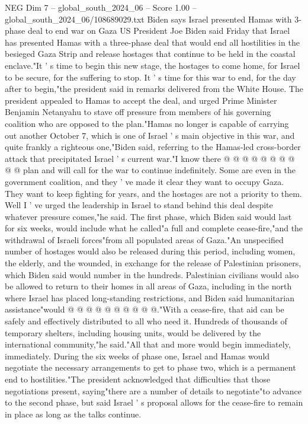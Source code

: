 \begin{textsample}{NEG Dim 7 – global\_south\_2024\_06 – Score 1.00 – global\_south\_2024\_06/108689029.txt}  \label{ex:f7_neg_219}
Biden says Israel presented Hamas with 3-phase deal to end war on Gaza US President Joe Biden said Friday that Israel has presented Hamas with a three-phase deal that would end all hostilities in the besieged Gaza Strip and release hostages that continue to be held in the coastal enclave."It ' s time to begin this new stage, the hostages to come home, for Israel to be secure, for the suffering to stop.
It ' s time for this war to end, for the day after to begin,"the president said in remarks delivered from the White House.
The president appealed to Hamas to accept the deal, and urged Prime Minister Benjamin Netanyahu to stave off pressure from members of his governing coalition who are opposed to the plan."Hamas no longer is capable of carrying out another October 7, which is one of Israel ' s main objective in this war, and quite frankly a righteous one,"Biden said, referring to the Hamas-led cross-border attack that precipitated Israel ' s current war."I know there @ @ @ @ @ @ @ @ @ @ plan and will call for the war to continue indefinitely.
Some are even in the government coalition, and they ' ve made it clear they want to occupy Gaza.
They want to keep fighting for years, and the hostages are not a priority to them.
Well I ' ve urged the leadership in Israel to stand behind this deal despite whatever pressure comes,"he said.
The first phase, which Biden said would last for six weeks, would include what he called"a full and complete cease-fire,"and the withdrawal of Israeli forces"from all populated areas of Gaza."An unspecified number of hostages would also be released during this period, including women, the elderly, and the wounded, in exchange for the release of Palestinian prisoners, which Biden said would number in the hundreds.
Palestinian civilians would also be allowed to return to their homes in all areas of Gaza, including in the north where Israel has placed long-standing restrictions, and Biden said humanitarian assistance"would @ @ @ @ @ @ @ @ @ @."With a cease-fire, that aid can be safely and effectively distributed to all who need it.
Hundreds of thousands of temporary shelters, including housing units, would be delivered by the international community,"he said."All that and more would begin immediately, immediately.
During the six weeks of phase one, Israel and Hamas would negotiate the necessary arrangements to get to phase two, which is a permanent end to hostilities."The president acknowledged that difficulties that those negotiations present, saying"there are a number of details to negotiate"to advance to the second phase, but said Israel ' s proposal allows for the cease-fire to remain in place as long as the talks continue.

\end{textsample}
